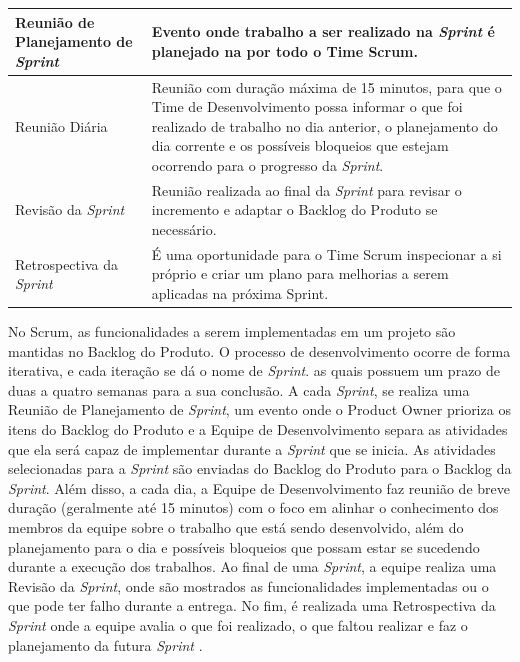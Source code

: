 \begin{table}[h!]
\begin{tabular}{|p{3cm}|p{12cm}|}
        \hline
        Reunião de Planejamento de \textit{Sprint} & Evento onde trabalho a ser realizado na \textit{Sprint} é planejado na por todo o Time Scrum. \\
        \hline
        Reunião Diária & Reunião com duração máxima de 15 minutos, para que o Time de Desenvolvimento possa informar o que foi realizado de trabalho no dia anterior, o planejamento do dia corrente e os possíveis bloqueios que estejam ocorrendo para o progresso da \textit{Sprint}.\\
        \hline
        Revisão da \textit{Sprint} & Reunião realizada ao final da \textit{Sprint} para revisar o incremento e adaptar o Backlog do Produto se necessário.\\
        \hline
        Retrospectiva da \textit{Sprint} & É uma oportunidade para o Time Scrum inspecionar a si próprio e criar um plano para melhorias a serem aplicadas na próxima Sprint.\\ 
        \hline
    \end{tabular}
    \label{table:1}
  \end{table}

No Scrum, as funcionalidades a serem implementadas em um projeto são mantidas no Backlog do Produto. O processo de desenvolvimento ocorre de forma iterativa, e cada iteração se dá o nome de \textit{Sprint}. as quais possuem um prazo de duas a quatro semanas para a sua conclusão. A cada \textit{Sprint}, se realiza uma Reunião de Planejamento de \textit{Sprint}, um evento onde o Product Owner prioriza os itens do Backlog do Produto e a Equipe de Desenvolvimento separa as atividades que ela será capaz de implementar durante a \textit{Sprint} que se inicia. As atividades selecionadas para a \textit{Sprint} são enviadas do Backlog do Produto para o Backlog da \textit{Sprint}. Além disso, a cada dia, a Equipe de Desenvolvimento faz reunião de breve duração (geralmente até 15 minutos) com o foco em alinhar o conhecimento dos membros da equipe sobre o trabalho que está sendo desenvolvido, além do planejamento para o dia e possíveis bloqueios que possam estar se sucedendo durante a execução dos trabalhos. Ao final de uma \textit{Sprint}, a equipe realiza uma Revisão da \textit{Sprint}, onde são mostrados as funcionalidades implementadas ou o que pode ter falho durante a entrega. No fim, é realizada uma Retrospectiva da \textit{Sprint} onde a equipe avalia o que foi realizado, o que faltou realizar e faz o planejamento da futura \textit{Sprint} \cite{Scrum}.

